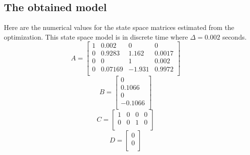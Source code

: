 \subsection{The obtained model}
    Here are the numerical values for the state space matrices estimated from the optimization. This state space model is in discrete time where $\Delta = 0.002$ seconds.\\
   \[
   A = 
   \begin{bmatrix}
    1 & 0.002 & 0 & 0\\
    0 & 0.9283 & 1.162 & 0.0017\\
    0 & 0 & 1 & 0.002\\
    0 & 0.07169 & -1.931 & 0.9972\\
     \end{bmatrix}
        \]
   \[
           B = 
   \begin{bmatrix}
    0 \\
    0.1066 \\
    0 \\
    -0.1066 \\
     \end{bmatrix}
        \]
   \[
    C = 
   \begin{bmatrix}
    1 & 0 & 0 & 0 \\
    0 & 0 & 1 & 0\\
     \end{bmatrix}
        \]
    \[
            D = 
   \begin{bmatrix}
     0  \\
     0 \\
     \end{bmatrix}
        \]

